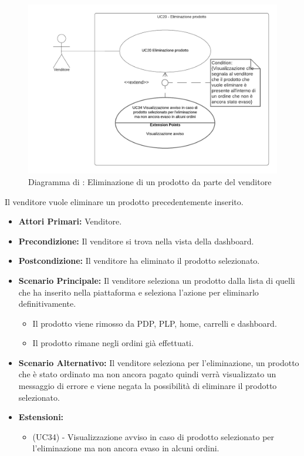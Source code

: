\begin{figure}[H]
    \centering
    \includegraphics[width=\textwidth]{Immagini/DiagrammiUC/UC20EliminazioneProdotto}
    \caption{Diagramma di \actualUC: Eliminazione di un prodotto da parte del venditore} 
    \label{fig:EliminazioneProdotto}
\end{figure}

Il venditore vuole eliminare un prodotto precedentemente inserito.
\begin{itemize}
    \item \textbf{Attori Primari:} Venditore.
    \item \textbf{Precondizione:} Il venditore si trova nella vista della dashboard.
    \item \textbf{Postcondizione:} Il venditore ha eliminato il prodotto selezionato.
    \item \textbf{Scenario Principale:} Il venditore seleziona un prodotto dalla lista di quelli che ha inserito nella piattaforma e seleziona l'azione per eliminarlo definitivamente.
    \begin{itemize}
    \item Il prodotto viene rimosso da PDP, PLP, home, carrelli e dashboard.
    \item Il prodotto rimane negli ordini già effettuati.
    \end{itemize}
    \item \textbf{Scenario Alternativo:} Il venditore seleziona per l'eliminazione, un prodotto che è stato ordinato ma non ancora pagato quindi verrà visualizzato un messaggio di errore e viene negata la possibilità di eliminare il prodotto selezionato.
    \item \textbf{Estensioni:}
    \begin{itemize}
        \item (UC34) - Visualizzazione avviso in caso di prodotto selezionato per l’eliminazione ma non ancora evaso in alcuni ordini.
    \end{itemize}
\end{itemize}

